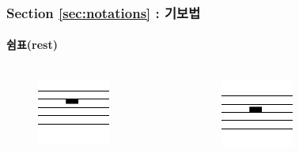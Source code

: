 \documentclass{beamer}
\begin{document}
	\begin{frame}
		\frametitle{Section \ref{sec:notations} : 기보법}
		\framesubtitle{쉼표(rest)}
		\vskip -1pc
		\begin{columns}
			\begin{column}{0.33\textwidth}
				\centering
				\noindent
				\begin{figure}[h!]
					\includegraphics[width=0.7\columnwidth]{res/pdf/4/rest/whole.pdf}
				\end{figure}
			\end{column}
			\begin{column}{0.33\textwidth}
				\centering
				\noindent
				\begin{figure}[h!]
					\includegraphics[width=0.7\columnwidth]{res/pdf/4/rest/half.pdf}
				\end{figure}
			\end{column}
			\begin{column}{0.33\textwidth}

\end{column}
\end{columns}
\end{frame}
\end{document}

